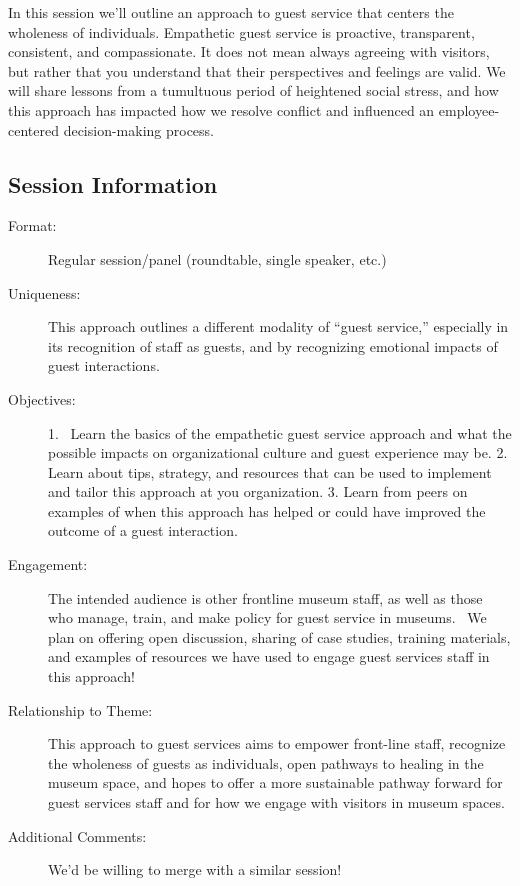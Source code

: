 \documentclass{report}
\begin{document}
              In this session we’ll outline an approach to guest service that centers the wholeness of individuals. Empathetic guest service is proactive, transparent, consistent, and compassionate. It does not mean always agreeing with visitors, but rather that you understand that their perspectives and feelings are valid. We will share lessons from a tumultuous period of heightened social stress, and how this approach has impacted how we resolve conflict and influenced an employee-centered decision-making process.

              \subsection*{Session Information}
                \begin{description}
                  \item [Format:] Regular session/panel (roundtable, single speaker, etc.)
							    
							    \item [Uniqueness:]This approach outlines a different modality of “guest service,” especially in its recognition of staff as guests, and by recognizing emotional impacts of guest interactions.
							    \item [Objectives:]1.  Learn the basics of the empathetic guest service approach and what the possible impacts on organizational culture and guest experience may be.
2. Learn about tips, strategy, and resources that can be used to implement and tailor this approach at you organization.
3. Learn from peers on examples of when this approach has helped or could have improved the outcome of a guest interaction.
							    \item [Engagement:]The intended audience is other frontline museum staff, as well as those who manage, train, and make policy for guest service in museums.  We plan on offering open discussion, sharing of case studies, training materials, and examples of resources we have used to engage guest services staff in this approach!
							    \item [Relationship to Theme:]This approach to guest services aims to empower front-line staff, recognize the wholeness of guests as individuals, open pathways to healing in the museum space, and hopes to offer a more sustainable pathway forward for guest services staff and for how we engage with visitors in museum spaces.
							    
                    \item [Additional Comments: ]We'd be willing to merge with a similar session!

                \end{description}
\end{document}
